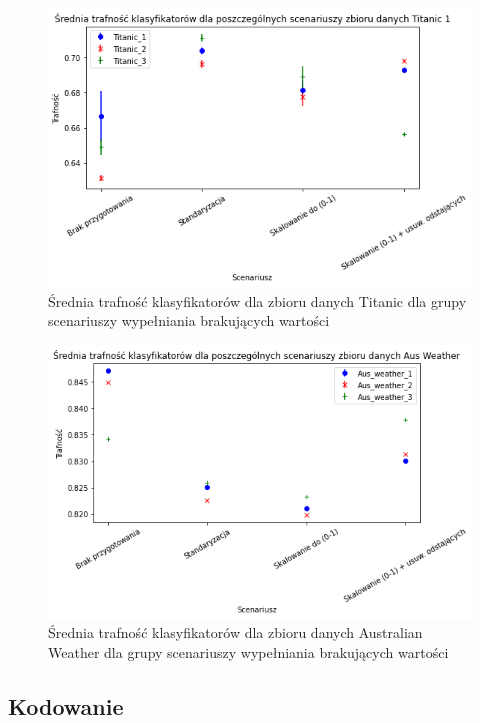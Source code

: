 \documentclass{book}
\begin{document}
\begin{figure}[H]
    \centerline{\includegraphics[scale=0.5]{Titanic_Avg_Standaryzacja}}
    \centering
    \caption{Średnia trafność klasyfikatorów dla zbioru danych Titanic 
    dla grupy scenariuszy wypełniania brakujących wartości}
    \end{figure}

\begin{figure}[H]
    \centerline{\includegraphics[scale=0.5]{Aus_Weather_Avg_Standaryzacja}}
    \centering
    \caption{Średnia trafność klasyfikatorów dla zbioru danych Australian Weather 
    dla grupy scenariuszy wypełniania brakujących wartości}
    \end{figure}

\subsection{Kodowanie}
\end{document}

